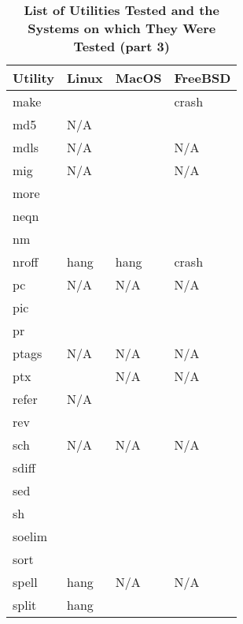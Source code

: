 \begin{table}[htbp]  %
\renewcommand\thetable{1}
\centering  %
 \begin{tabular}{|p{2.5cm}|p{2cm}|p{2cm}|p{2cm}|} 
     \hline
     \hline
        Utility & Linux & MacOS & FreeBSD \\ %
       \hline
       make &   &   & crash   \\
       md5 & N/A  &   &    \\
       mdls & N/A  &   & N/A   \\
       mig & N/A  &   & N/A   \\
       more &   &   &    \\
       neqn &   &   &    \\
       nm &   &   &    \\
       nroff & hang  & hang  & crash \\
       pc & N/A  & N/A  & N/A   \\
       pic &   &   &    \\
       pr &   &   &    \\
       ptags & N/A  & N/A  & N/A   \\
       ptx &   & N/A  & N/A   \\
       refer & N/A  &   &    \\
       rev &   &   &    \\
       sch & N/A  & N/A  & N/A \\
       sdiff &   &   &    \\
       sed &   &   &    \\
       sh &   &   &    \\
       soelim &   &   &    \\
       sort &   &   &    \\
       spell & hang  & N/A  & N/A   \\
       split & hang  &   &    \\
       \hline
       \hline
   \end{tabular}
   \caption{\textbf{List of Utilities Tested and the Systems on which They Were Tested (part 3)}}  %
\end{table}



